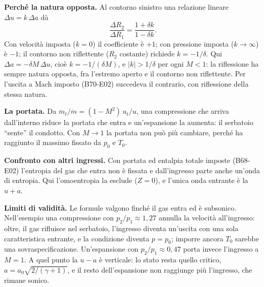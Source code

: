 \documentclass[11pt,a4paper]{article}
\newcommand{\Ru}{R_1}
\newcommand{\Rd}{R_2}
\newcommand{\uma}{u-a}
\newcommand{\upa}{u+a}
\begin{document}
\textbf{Perché la natura opposta.} Al contorno sinistro una relazione lineare $\Delta u=k\,\Delta a$ dà
\[
  \frac{\Delta\Rd}{\Delta\Ru}=\frac{1+\delta k}{1-\delta k}.
\]
Con velocità imposta ($k=0$) il coefficiente è $+1$; con pressione imposta ($k\to\infty$) è $-1$; il contorno non
riflettente ($\Rd$ costante) richiede $k=-1/\delta$. Qui $\Delta a=-\delta M\,\Delta u$, cioè $k=-1/(\delta M)$, e
$|k|>1/\delta$ per ogni $M<1$: la riflessione ha sempre
natura opposta, fra l'estremo aperto e il contorno non riflettente. Per l'uscita a Mach imposto (B70-E02) succedeva
il contrario, con riflessione della stessa natura.

\textbf{La portata.} Da $\dot m_t/\dot m=(1-M^2)\,u_t/u$, una compressione che arriva dall'interno riduce la
portata che entra e un'espansione la aumenta: il serbatoio ``sente'' il condotto. Con $M\to1$ la portata non può
più cambiare, perché ha raggiunto il massimo fissato da $p_0$ e $T_0$.

\textbf{Confronto con altri ingressi.} Con portata ed entalpia totale imposte (B68-E02) l'entropia del gas che
entra non è fissata e dall'ingresso parte anche un'onda di entropia. Qui l'omoentropia la esclude ($Z=0$), e
l'unica onda entrante è la $\upa$.

\textbf{Limiti di validità.} Le formule valgono finché il gas entra ed è subsonico. Nell'esempio una compressione con
$p_2/p_1\approx1{,}27$ annulla la velocità all'ingresso: oltre, il gas rifluisce nel serbatoio, l'ingresso diventa
un'uscita con una sola caratteristica entrante, e la condizione diventa $p=p_0$; imporre ancora $T_0$ sarebbe una
sovraspecificazione. Un'espansione con $p_2/p_1\approx0{,}47$ porta invece l'ingresso a $M=1$. A quel punto la
$\uma$ è verticale: lo stato resta quello critico, $a=a_0\sqrt{2/(\gamma+1)}$, e il resto dell'espansione non
raggiunge più l'ingresso, che rimane sonico.
\end{document}
